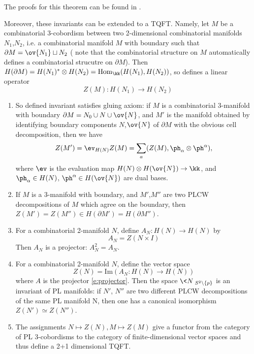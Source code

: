 The proofs for this theorem can be found in \cite{balsam-kirillov}.

Moreover, these invariants can be extended to a TQFT. Namely, let $M$ be a combinatorial 3-cobordism between 
two 2-dimensional combinatorial manifolds $N_1$,$N_2$, i.e. a combinatorial manifold $M$ with boundary such
 that $\partial M = \ov{N_1} \sqcup N_2$ ( note that the combinatorial structure on $M$ automatically defines a 
 combinatorial strucutre on $\partial M$). Then $H(\partial M)=H(N_1)^* \otimes H(N_2)=\mathrm{Hom}_\kk ( H(N_1),H(N_2))$, 
 so  defines a linear operator
\[
Z(M): H(N_1) \rightarrow H(N_2)
\]

\begin{theorem}\label{t:main2}
\par\noindent
	\begin{enumerate}
		\item So defined invariant satisfies gluing axiom: if $M$ is a combinatorial 3-manifold with boundary 
		$\partial M=N_0 \cup N \cup \ov{N}$, and $M'$ is the manifold obtained by identifying boundary components 
		$N$,$\ov{N}$ of $\partial M$ with the obvious cell decomposition, then we have
		\[
		Z(M')= \ev_{H(N)} Z(M) = \sum_a (Z(M),\ph_\alpha \otimes \ph^\alpha),
		\]
		where $\ev$ is the evaluation map $H(N)\otimes H(\ov{N}) \rightarrow  \kk $, and $\ph_\alpha \in H(N)$,
		 $\ph^\alpha \in H(\ov{N})$ are dual bases.
		\item If $M$ is a 3-manifold with boundary, and $M'$,$M''$ are two PLCW decompositions of $M$ which 
		agree on the boundary, then $Z(M')=Z(M'') \in H( \partial M')=H(\partial M'')$.
		\item For a combinatorial 2-manifold $N$, define $A_N:H(N) \rightarrow H(N)$ by
		\begin{equation}\label{e:projector}
			A_N=Z(N \times I)
		\end{equation}
		Then $A_N$ is a projector: $A^2_N = A_N$.
		\item For a combinatorial 2-manifold $N$, define the vector space
		\begin{equation}
			Z(N)= \mathrm{Im}(A_N:H(N) \rightarrow H(N))
		\end{equation}
		where $A$ is the projector \eqref{e:projector}. Then the space $\<N\>_{S^2\setminus\{p\}}$ is an invariant of PL 
		manifolds: if $N'$, $N''$ are two different PLCW decompositions of the same PL manifold N, then one has a
		 canonical isomorphism $Z(N') \simeq Z(N'')$.
		\item The assignments $N \mapsto Z(N), M \mapsto Z(M)$ give a functor from the category of PL 3-cobordisms
		 to the category of finite-dimensional vector spaces and thus define a 2+1 dimensional TQFT.
		\end{enumerate}
\end{theorem}

